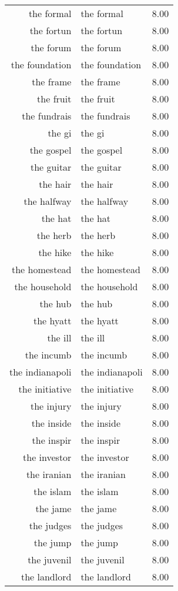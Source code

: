 \begin{table}[ht]
\begin{tabular}{rlr}
  the formal & the formal & 8.00 \\ 
  the fortun & the fortun & 8.00 \\ 
  the forum & the forum & 8.00 \\ 
  the foundation & the foundation & 8.00 \\ 
  the frame & the frame & 8.00 \\ 
  the fruit & the fruit & 8.00 \\ 
  the fundrais & the fundrais & 8.00 \\ 
  the gi & the gi & 8.00 \\ 
  the gospel & the gospel & 8.00 \\ 
  the guitar & the guitar & 8.00 \\ 
  the hair & the hair & 8.00 \\ 
  the halfway & the halfway & 8.00 \\ 
  the hat & the hat & 8.00 \\ 
  the herb & the herb & 8.00 \\ 
  the hike & the hike & 8.00 \\ 
  the homestead & the homestead & 8.00 \\ 
  the household & the household & 8.00 \\ 
  the hub & the hub & 8.00 \\ 
  the hyatt & the hyatt & 8.00 \\ 
  the ill & the ill & 8.00 \\ 
  the incumb & the incumb & 8.00 \\ 
  the indianapoli & the indianapoli & 8.00 \\ 
  the initiative & the initiative & 8.00 \\ 
  the injury & the injury & 8.00 \\ 
  the inside & the inside & 8.00 \\ 
  the inspir & the inspir & 8.00 \\ 
  the investor & the investor & 8.00 \\ 
  the iranian & the iranian & 8.00 \\ 
  the islam & the islam & 8.00 \\ 
  the jame & the jame & 8.00 \\ 
  the judges & the judges & 8.00 \\ 
  the jump & the jump & 8.00 \\ 
  the juvenil & the juvenil & 8.00 \\ 
  the landlord & the landlord & 8.00 \\ 

\end{tabular}
\end{table}
